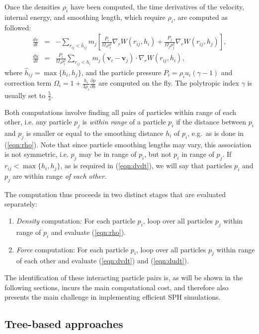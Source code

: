 \documentclass[final]{siamltex}
\newcommand{\eqn}[1]
    {(\ref{eqn:#1})}
\begin{document}
Once the densities $\rho_i$ have been computed,
the time derivatives
of the velocity, internal energy, and smoothing length, which
require $\rho_i$, are computed as followed:
%
\begin{eqnarray}
    \frac{dv}{dt} & = & -\sum_{r_{ij} < \hat{h}_{ij}} m_j \left[
        \frac{P_i}{\Omega_i\rho_i^2}\nabla_rW(r_{ij},h_i) +
        \frac{P_j}{\Omega_j\rho_j^2}\nabla_rW(r_{ij},h_j) \right], \label{eqn:dvdt} \\ 
    \frac{du}{dt} & = & \frac{P_i}{\Omega_i\rho_i^2} \sum_{r_{ij} < h_i} m_j(\mathbf v_i - \mathbf v_j) \cdot \nabla_rW(r_{ij},h_i), \label{eqn:dudt}
\end{eqnarray}
%
where $\hat{h}_{ij} = \max\{h_i,h_j\}$, and the particle pressure
$P_i=\rho_i u_i (\gamma-1)$ and correction term
$\Omega_i=1 + \frac{h_i}{3\rho_i}\frac{\partial \rho}{\partial h}$
are computed on the fly.
The polytropic index $\gamma$ is usually set to $\frac{5}{3}$.

Both computations involve finding all pairs of particles
within range of each other, i.e.
any particle $p_j$ is {\em within range} of a particle $p_i$
if the distance between $p_i$ and $p_j$ is smaller or equal
to the smoothing distance $h_i$ of $p_i$, e.g.~as is done in \eqn{rho}.
Note that since particle smoothing lengths may vary, this
association is not symmetric, i.e. $p_j$ may be in range of
$p_i$, but not $p_i$ in range of $p_j$.
If $r_{ij} < \max\{h_i,h_j\}$, as is required in \eqn{dvdt},
we will say that particles $p_i$ and $p_j$ are within range
{\em of each other}.

The computation thus proceeds in two distinct stages that are
evaluated separately:
\begin{enumerate}
    \item {\em Density} computation: For each particle $p_i$,
        loop over all particles $p_j$ within range of $p_i$ and evaluate
        \eqn{rho}.
    \item {\em Force} computation: For each particle $p_i$,
        loop over all particles $p_j$
        within range of each other and evaluate \eqn{dvdt} and \eqn{dudt}.
\end{enumerate}
The identification of these interacting particle pairs is,
as will be shown in the following sections, incurs the main computational
cost, and therefore also presents the main challenge in implementing efficient
SPH simulations.


\subsection{Tree-based approaches}
\end{document}
